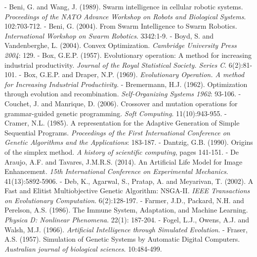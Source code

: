 \documentclass[spanish,a4paper,12pt,twoside]{report}
\begin{document}
  \begin{thebibliography}{00}
  \vspace{-1cm}
  \makeatletter
  \def\@biblabel#1{}
  \let\old@bibitem\bibitem
  \def\bibitem#1{\old@bibitem{#1}\leavevmode\kern-\bibindent}
  \makeatother
  
   Beni, G. and Wang, J. (1989). Swarm intelligence in cellular robotic systems. \emph{Proceedings of the NATO Advance Workshop on Robots and Biological Systems}. 102:703-712.
   Beni, G. (2004). From Swarm Intelligence to Swarm Robotics. \emph{International Workshop on Swarm Robotics}. 3342:1-9.
   Boyd, S. and Vandenberghe, L. (2004). Convex Optimization. \emph{Cambridge University Press 2004}: 129.
   Box, G.E.P. (1957). Evolutionary operation: A method for increasing industrial productivity. \emph{Journal of the Royal Statistical Society. Series C}. 6(2):81-101.
   Box, G.E.P. and Draper, N.P. (1969). \emph{Evolutionary Operation. A method for Increasing Industrial Productivity}.
   Bremermann, H.J. (1962). Optimization through evolution and recombination. \emph{Self-Organizing Systems 1962}: 93-106.
   Couchet, J. and Manrique, D. (2006). Crossover and mutation operations for grammar-guided genetic programming. \emph{Soft Computing}. 11(10):943-955.
   Cramer, N.L. (1985). A representation for the Adaptive Generation of Simple Sequential Programs. \emph{Proceedings of the First International Conference on Genetic Algorithms and the Applications}: 183-187.
   Dantzig, G.B. (1990). Origins of the simplex method. \emph{A history of scientific computing}, pages 141-151.
   De Araujo, A.F. and Tavares, J.M.R.S. (2014). An Artificial Life Model for Image Enhancement. \emph{15th International Conference on Experimental Mechanics}. 41(13):5892-5906.
   Deb, K., Agarwal, S., Pratap, A. and Meyarivan, T. (2002). A Fast and Elitist Multiobjective Genetic Algorithm: NSGA-II. \emph{IEEE Transactions on Evolutionary Computation}. 6(2):128-197.
   Farmer, J.D., Packard, N.H. and Perelson, A.S. (1986). The Immune System, Adaptation, and Machine Learning. \emph{Physica D: Nonlinear Phenomena}. 22(1): 187-204.
   Fogel, L.J., Owens, A.J. and Walsh, M.J. (1966). \emph{Artificial Intelligence through Simulated Evolution}.
   Fraser, A.S. (1957). Simulation of Genetic Systems by Automatic Digital Computers. \emph{Australian journal of biological sciences}. 10:484-499.

\end{thebibliography}
\end{document}
